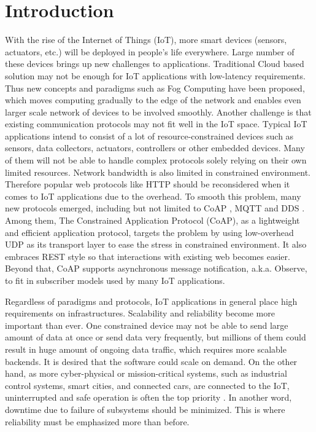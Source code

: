 \chapter{Introduction}\label{ch1}

With the rise of the Internet of Things (IoT), more smart devices (sensors, actuators, etc.) will be deployed in people's life everywhere. Large number of these devices brings up new challenges to applications. Traditional Cloud based solution may not be enough for IoT applications with low-latency requirements. Thus new concepts and paradigms such as Fog Computing \cite{Bonomi:2012:FCR:2342509.2342513} have been proposed, which moves computing gradually to the edge of the network and enables even larger scale network of devices to be involved smoothly. Another challenge is that existing communication protocols may not fit well in the IoT space. Typical IoT applications intend to consist of a lot of resource-constrained devices such as sensors, data collectors, actuators, controllers or other embedded devices. Many of them will not be able to handle complex protocols solely relying on their own limited resources. Network bandwidth is also limited in constrained environment. Therefore popular web protocols like HTTP should be reconsidered when it comes to IoT applications due to the overhead. To smooth this problem, many new protocols emerged, including but not limited to CoAP \cite{coap_protocol}, MQTT \cite{mqtt_protocol} and DDS \cite{dds}. Among them, The Constrained Application Protocol (CoAP), as a lightweight and efficient application protocol, targets the problem by using low-overhead UDP as its transport layer to ease the stress in constrained environment. It also embraces REST style so that interactions with existing web becomes easier. Beyond that, CoAP supports asynchronous message notification, a.k.a. Observe, to fit in subscriber models used by many IoT applications. 

Regardless of paradigms and protocols, IoT applications in general place high requirements on infrastructures. Scalability and reliability become more important than ever. One constrained device may not be able to send large amount of data at once or send data very frequently, but millions of them could result in huge amount of ongoing data traffic, which requires more scalable backends. It is desired that the software could scale on demand. On the other hand, as more cyber-physical or mission-critical systems, such as industrial control systems, smart cities, and connected cars, are connected to the IoT, uninterrupted and safe operation is often the top priority \cite{7498684}. In another word, downtime due to failure of subsystems should be minimized. This is where reliability must be emphasized more than before. 


